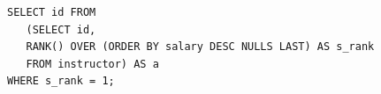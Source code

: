 \documentclass[aspectratio=169, 14pt]{beamer}
\begin{document}
\begin{frame}[fragile]

	\begin{verbatim}
SELECT id FROM 
   (SELECT id, 
   RANK() OVER (ORDER BY salary DESC NULLS LAST) AS s_rank
   FROM instructor) AS a
WHERE s_rank = 1;
    \end{verbatim}


\end{frame}
\end{document}
